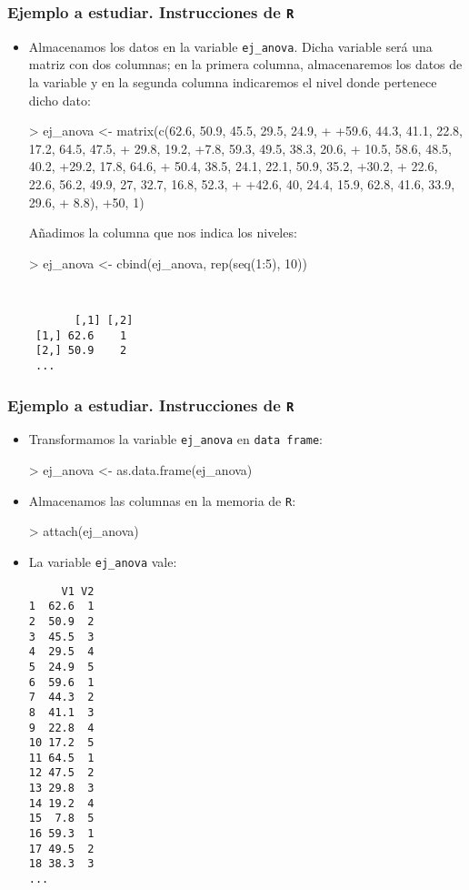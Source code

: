 \begin{frame}[fragile]
\frametitle{Ejemplo a estudiar. Instrucciones de {\tt R}}
\begin{itemize}
\item<2-> Almacenamos los datos en la variable {\tt ej\_anova}. Dicha variable será una matriz con dos columnas; en la primera columna, almacenaremos los datos de la variable y en la segunda columna indicaremos el nivel donde pertenece dicho dato:

\begin{Schunk}
\begin{Sinput}
> ej_anova <- matrix(c(62.6, 50.9, 45.5, 29.5, 24.9, 
+     +59.6, 44.3, 41.1, 22.8, 17.2, 64.5, 47.5, 
+     29.8, 19.2, +7.8, 59.3, 49.5, 38.3, 20.6, 
+     10.5, 58.6, 48.5, 40.2, +29.2, 17.8, 64.6, 
+     50.4, 38.5, 24.1, 22.1, 50.9, 35.2, +30.2, 
+     22.6, 22.6, 56.2, 49.9, 27, 32.7, 16.8, 52.3, 
+     +42.6, 40, 24.4, 15.9, 62.8, 41.6, 33.9, 29.6, 
+     8.8), +50, 1)
\end{Sinput}
\end{Schunk}

Añadimos la columna que nos indica los niveles:

\begin{Schunk}
\begin{Sinput}
> ej_anova <- cbind(ej_anova, rep(seq(1:5), 10))
\end{Sinput}
\end{Schunk}

{\small\tt
\begin{verbatim}
       [,1] [,2]
 [1,] 62.6    1
 [2,] 50.9    2
 ...
\end{verbatim}
}
\end{itemize}
\end{frame}
\begin{frame}[fragile]
\frametitle{Ejemplo a estudiar. Instrucciones de {\tt R}}
\begin{itemize}
\item<2-> Transformamos la variable {\tt ej\_anova} en {\tt data frame}:

\begin{Schunk}
\begin{Sinput}
> ej_anova <- as.data.frame(ej_anova)
\end{Sinput}
\end{Schunk}

\item<3-> Almacenamos las columnas en la memoria de {\tt R}:

\begin{Schunk}
\begin{Sinput}
> attach(ej_anova)
\end{Sinput}
\end{Schunk}

\item<4-> La variable {\tt ej\_anova} vale:
{\tiny     
\begin{verbatim}
     V1 V2
1  62.6  1
2  50.9  2
3  45.5  3
4  29.5  4
5  24.9  5
6  59.6  1
7  44.3  2
8  41.1  3
9  22.8  4
10 17.2  5
11 64.5  1
12 47.5  2
13 29.8  3
14 19.2  4
15  7.8  5
16 59.3  1
17 49.5  2
18 38.3  3
...
\end{verbatim}
}
\end{itemize}
\end{frame}
